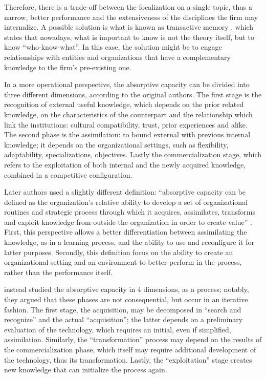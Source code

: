 Therefore, there is a trade-off between the focalization on a single topic, thus a narrow, better performance and the extensiveness of the disciplines the firm may internalize. A possible solution is what is known as transactive memory \citep{Wegner1987}, which states that nowadays, what is important to know is not the theory itself, but to know \enquote{who-know-what}. In this case, the solution might be to engage relationships with entities and organizations that have a complementary knowledge to the firm's pre-existing one. 

In a more operational perspective, the absorptive capacity can be divided into three different dimensions, according to the original authors. The first stage is the recognition of external useful knowledge, which depends on the prior related knowledge, on the characteristics of the counterpart and the relationship which link the institutions: cultural compatibility, trust, prior experiences and alike. The second phase is the assimilation: to bound external with previous internal knowledge; it depends on the organizational settings, such as flexibility, adaptability, specializations, objectives. Lastly the commercialization stage, which refers to the exploitation of both internal and the newly acquired knowledge, combined in a competitive configuration.

Later authors used a slightly different definition: \enquote{absorptive capacity can be defined as the organization's relative ability to develop a set of organizational routines and strategic process through which it acquires, assimilates, transforms and exploit knowledge from outside the organization in order to create value} \citep{Jimenez2011}. First, this perspective allows a better differentiation between assimilating the knowledge, as in a learning process, and the ability to use and reconfigure it for latter purposes. Secondly, this definition focus on the ability to create an organizational setting and an environment to better perform in the process, rather than the performance itself. 

\citet{Patterson2015} instead studied the absorptive capacity in 4 dimensions, as a process; notably, they argued that these phases are not consequential, but occur in an iterative fashion. The first stage, the acquisition, may be decomposed in \enquote{search and recognize} and the actual \enquote{acquisition}; the latter depends on a preliminary evaluation of the technology, which requires an initial, even if simplified, assimilation. Similarly, the \enquote{transformation} process may depend on the results of the commercialization phase, which itself may require additional development of the technology, thus its transformation. Lastly, the \enquote{exploitation} stage creates new knowledge that can initialize the process again. 

